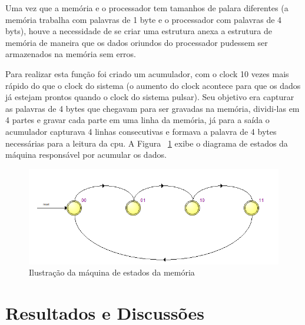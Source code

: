 \documentclass[
	11pt,				%
	openany,			%
	oneside,
	a4paper,			%
	chapter=TITLE,		%
	section=TITLE,		%
	english,			%
	brazil				%
	]{abntex2}
\begin{document}
Uma vez que a memória e o processador tem tamanhos de palara diferentes (a memória trabalha com palavras de 1 byte e o processador com palavras de 4 byts), houve a necessidade de se criar uma estrutura anexa a estrutura de memória de maneira que os dados oriundos do processador pudessem ser armazenados na memória sem erros.

Para realizar esta função foi criado um acumulador, com o clock 10 vezes mais rápido do que o clock do sistema (o aumento do clock acontece para que os dados já estejam prontos quando o clock do sistema pulsar). Seu objetivo era capturar as palavras de 4 bytes que chegavam para ser gravadas na memória, dividi-las em 4 partes e gravar cada parte em uma linha da memória, já para a saída o acumulador capturava 4 linhas consecutivas e formava a palavra de 4 bytes necessárias para a leitura da cpu. A Figura ~\ref{fig_statemachinememory} exibe o diagrama de estados da máquina responsável por acumular os dados.

\begin{figure}[H]
	\caption{\label{fig_statemachinememory}Ilustração da máquina de estados da memória}
	\begin{center}
	    \includegraphics[scale=0.7]{statemachinememory.PNG}
	\end{center}
\end{figure}

\chapter{Resultados e Discussões}
\end{document}
